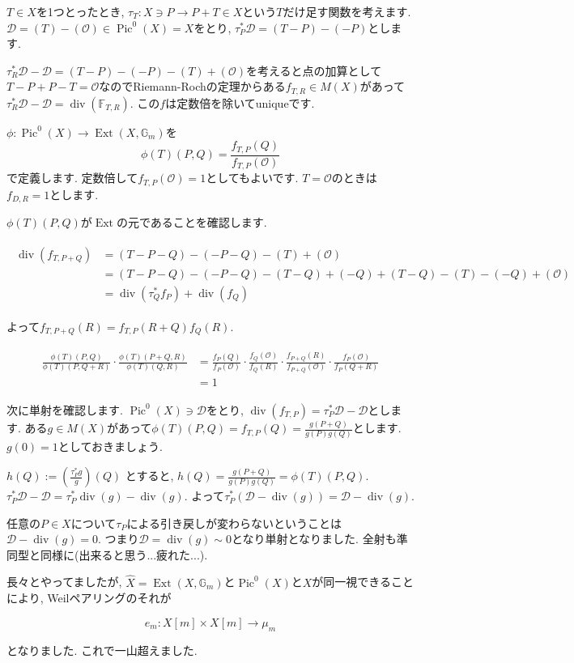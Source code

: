 \documentclass{jsarticle}
\newcommand{\FF}{\mathbb{F}}
\newcommand{\GG}{\mathbb{G}}
\newcommand{\makeop}[1]{\mathop{\mathrm{#1}}\nolimits}
\def\Ext{\makeop{Ext}}
\def\Pic{\makeop{Pic}}
\def\div{\makeop{div}}
\theoremstyle{definition}
\numberwithin{theorem}{section}
\begin{document}
$T \in X$を1つとったとき, $\tau_T : X \ni P \rightarrow P+T \in X$という$T$だけ足す関数を考えます. $\mathcal{D} = (T) - (\mathcal{O}) \in \Pic^0(X) = X$をとり, $\tau_P^*\mathcal{D} = (T-P) - (-P)$とします.

$\tau_R^*\mathcal{D} - \mathcal{D} = (T-P) - (-P) - (T) + (\mathcal{O})$を考えると点の加算として$T - P + P - T = \mathcal{O}$なのでRiemann-Rochの定理からある$f_{T, R} \in M(X)$があって$\tau_R^*\mathcal{D} - \mathcal{D} = \div(\FF_{T, R})$.
この$f$は定数倍を除いてuniqueです.

$\phi: \Pic^0(X) \rightarrow \Ext(X, \GG_m)$を
\[
\phi(T)(P, Q) = \frac{f_{T, P}(Q)}{f_{T, P}(\mathcal{O})}
\]
で定義します. 定数倍して$f_{T, P}(\mathcal{O}) = 1$としてもよいです. $T = \mathcal{O}$のときは$f_{D, R} = 1$とします.

$\phi(T)(P, Q)$が$\Ext$の元であることを確認します.

\begin{eqnarray*}
\begin{aligned}
\div(f_{T, P+Q}) &= (T-P-Q) - (-P-Q) - (T) + (\mathcal{O})\\
&= (T-P-Q) - (-P-Q) - (T-Q) + (-Q) + (T-Q) - (T) - (-Q) + (\mathcal{O})\\
&= \div(\tau_Q^*f_P) + \div(f_Q)
\end{aligned}
\end{eqnarray*}

よって$f_{T, P+Q}(R) = f_{T, P}(R+Q) f_Q(R)$.

\begin{eqnarray*}
\begin{aligned}
\frac{\phi(T)(P, Q) }{\phi(T)(P, Q+R)} \cdot \frac{\phi(T)(P+Q, R)}{\phi(T)(Q, R)}
&= \frac{f_P(Q)}{f_P(\mathcal{O})} \cdot \frac{f_Q(\mathcal{O})}{f_Q(R)} \cdot \frac{f_{P+Q}(R)}{f_{P+Q}(\mathcal{O})} \cdot \frac{f_P(\mathcal{O})}{f_P(Q+R)}\\
&= 1
\end{aligned}
\end{eqnarray*}

次に単射を確認します. $\Pic^0(X) \ni \mathcal{D}$をとり, $\div(f_{T, P}) = \tau_P^*\mathcal{D} - \mathcal{D}$とします. ある$g \in M(X)$があって$\displaystyle\phi(T)(P, Q) = f_{T, P}(Q) = \frac{g(P+Q)}{g(P) g(Q)}$とします. $g(0) = 1$としておきましょう.

$h(Q) := \left(\frac{\tau_P^*g}{g}\right)(Q)$ とすると, $h(Q) = \frac{g(P+Q)}{g(P)g(Q)} = \phi(T)(P, Q)$. $\tau_P^*\mathcal{D} - \mathcal{D} =\tau_P^*\div(g) - \div(g)$. よって$\tau_P^*(\mathcal{D} - \div(g)) = \mathcal{D} - \div(g)$.

任意の$P \in X$について$\tau_P$による引き戻しが変わらないということは$\mathcal{D} - \div(g) = 0$. つまり$\mathcal{D} = \div(g) \sim 0$となり単射となりました. 全射も準同型と同様に(出来ると思う...疲れた...).

長々とやってましたが, $\hat{X} = \Ext(X, \GG_m)$と$\Pic^0(X)$と$X$が同一視できることにより, Weilペアリングのそれが

\begin{equation*}
e_m: X[m] \times X[m] \rightarrow \mu_m
\end{equation*}

となりました. これで一山超えました.
\end{document}
